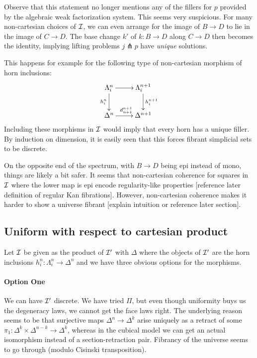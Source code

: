 \documentclass[reqno,10pt,a4paper,oneside]{amsart}
\begin{document}
Observe that this statement no longer mentions any of the fillers for $p$ provided by the algebraic weak factorization system.
This seems very suspicious.
For many non-cartesian choices of $\cal{I}$, we can even arrange for the image of $B \to D$ to lie in the image of $C \to D$.
The base change $k'$ of $k : B \to D$ along $C \to D$ then becomes the identity, implying lifting problems $j \pitchfork p$ have \emph{unique} solutions.

This happens for example for the following type of non-cartesian morphism of horn inclusions:
\[
\xymatrix{
  \Lambda_i^n
  \ar[r]
  \ar[d]_{h_i^n}
&
  \Lambda_i^{n+1}
  \ar[d]^{h_i^{n+1}}
\\
  \Delta^n
  \ar[r]^{d_{n+1}^{n+1}}
&
  \Delta^{n+1}
}
\]
Including these morphisms in $\cal{I}$ would imply that every horn has a unique filler.
By induction on dimension, it is easily seen that this forces fibrant simplicial sets to be discrete.

On the opposite end of the spectrum, with $B \to D$ being epi instead of mono, things are likely a bit safer.
It seems that non-cartesian coherence for squares in $\cal{I}$ where the lower map is epi encode regularity-like properties [reference later definition of regular Kan fibrations].
However, non-cartesian coherence makes it harder to show a universe fibrant [explain intuition or reference later section].

\subsection*{Uniform with respect to cartesian product}

Let $\cal{I}$ be given as the product of $\cal{I'}$ with $\Delta$ where the objects of $\cal{I'}$ are the horn inclusions $h_i^n : \Lambda_i^n \to \Delta^n$ and we have three obvious options for the morphisms.

\paragraph{Option One}

We can have $\cal{I'}$ discrete.
We have tried $\Pi$, but even though uniformity buys us the degeneracy laws, we cannot get the face laws right.
The underlying reason seems to be that surjective maps $\Delta^n \to \Delta^k$ arise uniquely as a retract of some $\pi_1 : \Delta^k \times \Delta^{n-k} \to \Delta^k$, whereas in the cubical model we can get an actual isomorphism instead of a section-retraction pair.
Fibrancy of the universe seems to go through (modulo Cisinski transposition).
\end{document}
